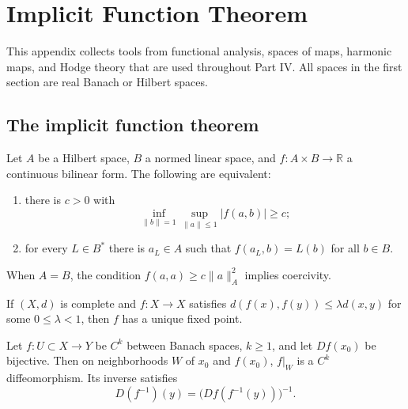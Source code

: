 \chapter{Implicit Function Theorem}
\label{app:chow-iv-appendix-k}

This appendix collects tools from functional analysis, spaces of maps,
harmonic maps, and Hodge theory that are used throughout Part IV.  All spaces
in the first section are real Banach or Hilbert spaces.

\section{The implicit function theorem}

\begin{theorem}
\label{thm:chow-iv-k1-lax-milgram-lions}

Let $A$ be a Hilbert space, $B$ a normed linear space, and
$f:A\times B\to\mathbb R$ a continuous bilinear form.  The following are
equivalent:
\begin{enumerate}
\item there is $c>0$ with
\[
\inf_{\|b\|=1}\sup_{\|a\|\le1}|f(a,b)|\ge c;
\]
\item for every $L\in B^*$ there is $a_L\in A$ such that
$f(a_L,b)=L(b)$ for all $b\in B$.
\end{enumerate}
When $A=B$, the condition $f(a,a)\ge c\|a\|_A^2$ implies coercivity.
\end{theorem}

\begin{lemma}
\label{lem:chow-iv-k2-contraction}

If $(X,d)$ is complete and $f:X\to X$ satisfies
$d(f(x),f(y))\le\lambda d(x,y)$ for some $0\le\lambda<1$, then $f$ has a
unique fixed point.
\end{lemma}

\begin{theorem}
\label{thm:chow-iv-k3-banach-inverse-function}


Let $f:U\subset X\to Y$ be $C^k$ between Banach spaces, $k\ge1$, and let
$Df(x_0)$ be bijective.  Then on neighborhoods $W$ of $x_0$ and $f(x_0)$,
$f|_W$ is a $C^k$ diffeomorphism.  Its inverse satisfies
\[
D(f^{-1})(y)=\bigl(Df(f^{-1}(y))\bigr)^{-1}.
\]
\end{theorem}

